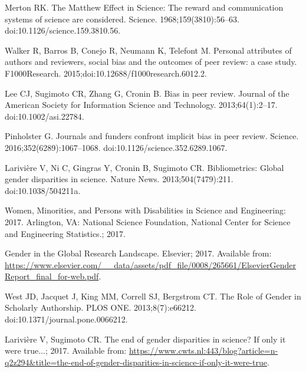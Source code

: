 \documentclass[10pt,letterpaper]{article}
\begin{document}
%
\newpage
\begin{thebibliography}{100}

Merton RK.
\newblock The {Matthew} {Effect} in {Science}: {The} reward and communication
  systems of science are considered.
\newblock Science. 1968;159(3810):56--63.
\newblock doi:{10.1126/science.159.3810.56}.

Walker R, Barros B, Conejo R, Neumann K, Telefont M.
\newblock Personal attributes of authors and reviewers, social bias and the
  outcomes of peer review: a case study.
\newblock F1000Research. 2015;doi:{10.12688/f1000research.6012.2}.

Lee CJ, Sugimoto CR, Zhang G, Cronin B.
\newblock Bias in peer review.
\newblock Journal of the American Society for Information Science and
  Technology. 2013;64(1):2--17.
\newblock doi:{10.1002/asi.22784}.

Pinholster G.
\newblock Journals and funders confront implicit bias in peer review.
\newblock Science. 2016;352(6289):1067--1068.
\newblock doi:{10.1126/science.352.6289.1067}.

Larivi{\`e}re V, Ni C, Gingras Y, Cronin B, Sugimoto CR.
\newblock Bibliometrics: {Global} gender disparities in science.
\newblock Nature News. 2013;504(7479):211.
\newblock doi:{10.1038/504211a}.

Women, {Minorities}, and {Persons} with {Disabilities} in {Science} and
  {Engineering}: 2017.
\newblock Arlington, VA: National Science Foundation, National Center for
  Science and Engineering Statistics.; 2017.

Gender in the {Global} {Research} {Landscape}.
\newblock Elsevier; 2017.
\newblock Available from:
  \url{https://www.elsevier.com/__data/assets/pdf_file/0008/265661/ElsevierGenderReport_final_for-web.pdf}.

West JD, Jacquet J, King MM, Correll SJ, Bergstrom CT.
\newblock The {Role} of {Gender} in {Scholarly} {Authorship}.
\newblock PLOS ONE. 2013;8(7):e66212.
\newblock doi:{10.1371/journal.pone.0066212}.

Larivi{\`e}re V, Sugimoto CR. The end of gender disparities in science? {If}
  only it were true...; 2017.
\newblock Available from:
  \url{https://www.cwts.nl:443/blog?article=n-q2z294&title=the-end-of-gender-disparities-in-science-if-only-it-were-true}.


\end{thebibliography}
\end{document}
